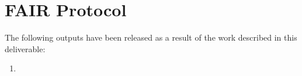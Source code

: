 \chapter{FAIR Protocol}
\label{ch:fair}

The following outputs have been released as a result of the work described in this deliverable:

\begin{enumerate}
    \item 
\end{enumerate}
